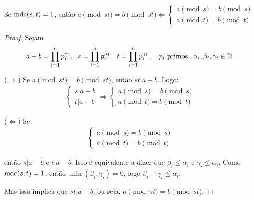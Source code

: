 	
	\begin{lemma}
		\label{lema1}
		Se $\operatorname{mdc}(s, t) = 1$, então $a\pmod {st} = b\pmod {st} \Leftrightarrow \begin{cases}
		a\pmod s = b\pmod s \\ a\pmod t = b\pmod t
		\end{cases}$
		
	\end{lemma}
	
	\begin{proof}
		Sejam 
		\begin{align*}
		a - b = \prod_{i = 1}^{n}p_i^{\alpha_i}, \hspace{0.2cm} s = \prod_{i = 1}^{n}p_i^{\beta_i}, \hspace{0.2cm} t = \prod_{i=1}^{n}p_i^{\gamma_i}, \hspace{0.4cm} p_i\text{ primos }, \alpha_i, \beta_i, \gamma_i\in\mathbb{N}.
		\end{align*}
		
		($\Rightarrow$) Se $a\pmod {st} = b\pmod {st}$, então $st|a-b$. Logo:
		\begin{align*}
		\begin{cases}
		s|a-b \\
		t|a-b
		\end{cases}\Rightarrow
		\begin{cases}
		a\pmod s = b\pmod s\\
		a\pmod t = b\pmod t
		\end{cases}
		\end{align*}
		\par\vspace{0.3cm}($\Leftarrow$) Se 
		\begin{align*}
		\begin{cases}
		a\pmod s = b\pmod s \\
		a\pmod t = b\pmod t
		\end{cases}
		\end{align*}
		\par\vspace{0.3cm} então $s|a-b$ e $t|a-b$. Isso é equivalente a dizer que $\beta_i\leq\alpha_i$ e $\gamma_i\leq\alpha_i$. Como $\operatorname{mdc}(s,t) = 1$, então $\min(\beta_i, \gamma_i) = 0$, logo $\beta_i + \gamma_i \leq \alpha_i$.
		\par\vspace{0.3cm} Mas isso implica que $st|a-b$, ou seja, $a\pmod {st} = b\pmod {st}$.
		
	\end{proof}
	
